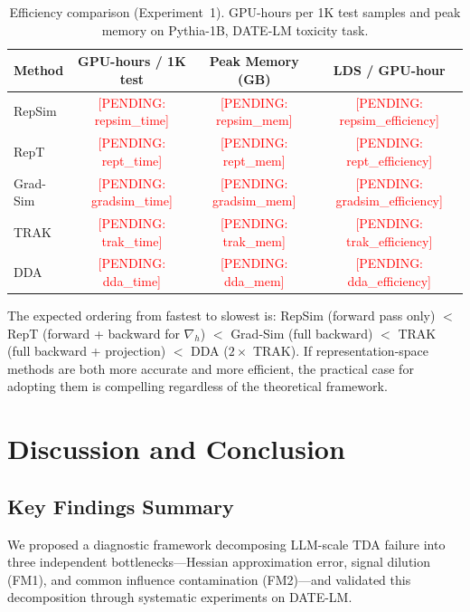 \documentclass{article}
\newcommand{\pending}[1]{\textcolor{red}{[PENDING: #1]}}
\begin{document}
\begin{table}[t]
    \centering
    \caption{Efficiency comparison (Experiment~1). GPU-hours per 1K test samples and peak memory on Pythia-1B, DATE-LM toxicity task.}
    \label{tab:efficiency}
    \small
    \begin{tabular}{lccc}
        \toprule
        Method & GPU-hours / 1K test & Peak Memory (GB) & LDS / GPU-hour \\
        \midrule
        RepSim & \pending{repsim\_time} & \pending{repsim\_mem} & \pending{repsim\_efficiency} \\
        RepT & \pending{rept\_time} & \pending{rept\_mem} & \pending{rept\_efficiency} \\
        Grad-Sim & \pending{gradsim\_time} & \pending{gradsim\_mem} & \pending{gradsim\_efficiency} \\
        TRAK & \pending{trak\_time} & \pending{trak\_mem} & \pending{trak\_efficiency} \\
        DDA & \pending{dda\_time} & \pending{dda\_mem} & \pending{dda\_efficiency} \\
        \bottomrule
    \end{tabular}
\end{table}

The expected ordering from fastest to slowest is: RepSim (forward pass only) $<$ RepT (forward + backward for $\nabla_h$) $<$ Grad-Sim (full backward) $<$ TRAK (full backward + projection) $<$ DDA ($2\times$ TRAK). If representation-space methods are both more accurate and more efficient, the practical case for adopting them is compelling regardless of the theoretical framework.

\section{Discussion and Conclusion}
\label{sec:discussion}

\subsection{Key Findings Summary}

We proposed a diagnostic framework decomposing LLM-scale TDA failure into three independent bottlenecks---Hessian approximation error, signal dilution (FM1), and common influence contamination (FM2)---and validated this decomposition through systematic experiments on DATE-LM.
\end{document}
